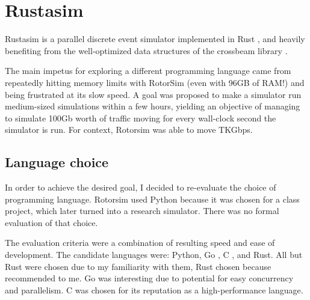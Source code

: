 \section{Rustasim} \label{rustasim}

Rustasim \cite{brode-roger_nibriviarustasim_2020} is a parallel discrete event simulator implemented in Rust \cite{klabnik_rust_2018}\cite{matsakis_rust_2014}, and heavily benefiting from the well-optimized data structures of the crossbeam library \cite{noauthor_crossbeam-rscrossbeam_2020}.

The main impetus for exploring a different programming language came from repeatedly hitting memory limits with RotorSim (even with 96GB of RAM!) and being frustrated at its slow speed.
A goal was proposed to make a simulator run medium-sized simulations within a few hours, yielding an objective of managing to simulate 100Gb worth of traffic moving for every wall-clock second the simulator is run.
For context, Rotorsim was able to move TKGbps. %


\subsection{Language choice} \label{rustasim-language}

In order to achieve the desired goal, I decided to re-evaluate the choice of programming language.
Rotorsim used Python because it was chosen for a class project, which later turned into a research simulator.
There was no formal evaluation of that choice.

The evaluation criteria were a combination of resulting speed and ease of development.
The candidate languages were: Python, Go \cite{donovan_go_2015}, C \cite{kernighan_c_1988}, and Rust.
All but Rust were chosen due to my familiarity with them, Rust chosen because recommended to me.
Go was interesting due to potential for easy concurrency and parallelism.
C was chosen for its reputation as a high-performance language.

